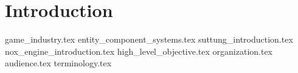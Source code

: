 \chapter{Introduction}
\label{chap:introduction}

{game_industry.tex}
{entity_component_systems.tex}
{suttung_introduction.tex}
{nox_engine_introduction.tex}
{high_level_objective.tex}
{organization.tex}
{audience.tex}
{terminology.tex}
